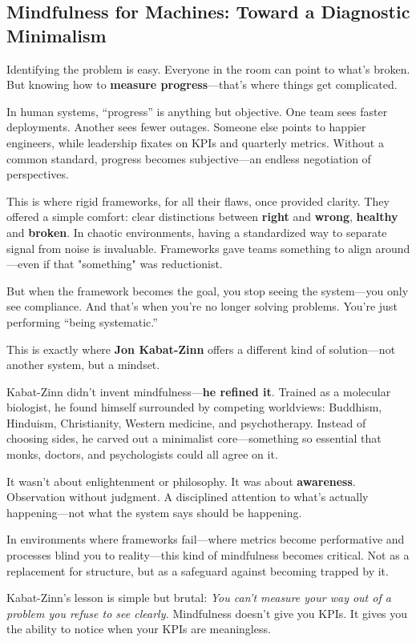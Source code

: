 \subsection{Mindfulness for Machines: Toward a Diagnostic Minimalism}

Identifying the problem is easy. Everyone in the room can point to what's broken.  
But knowing how to \textbf{measure progress}—that’s where things get complicated.

In human systems, “progress” is anything but objective. One team sees faster deployments. Another sees fewer outages. Someone else points to happier engineers, while leadership fixates on KPIs and quarterly metrics. Without a common standard, progress becomes subjective—an endless negotiation of perspectives.

This is where rigid frameworks, for all their flaws, once provided clarity. They offered a simple comfort: clear distinctions between \textbf{right} and \textbf{wrong}, \textbf{healthy} and \textbf{broken}. In chaotic environments, having a standardized way to separate signal from noise is invaluable. Frameworks gave teams something to align around—even if that "something" was reductionist.

But when the framework becomes the goal, you stop seeing the system—you only see compliance.  
And that’s when you're no longer solving problems. You're just performing “being systematic.”

This is exactly where \textbf{Jon Kabat-Zinn} offers a different kind of solution—not another system, but a mindset.

Kabat-Zinn didn’t invent mindfulness—\textbf{he refined it}. Trained as a molecular biologist, he found himself surrounded by competing worldviews: Buddhism, Hinduism, Christianity, Western medicine, and psychotherapy. Instead of choosing sides, he carved out a minimalist core—something so essential that monks, doctors, and psychologists could all agree on it.

It wasn’t about enlightenment or philosophy. It was about \textbf{awareness}.  Observation without judgment. A disciplined attention to what’s actually happening—not what the system says should be happening.

In environments where frameworks fail—where metrics become performative and processes blind you to reality—this kind of mindfulness becomes critical. Not as a replacement for structure, but as a safeguard against becoming trapped by it.

Kabat-Zinn’s lesson is simple but brutal: \textit{You can’t measure your way out of a problem you refuse to see clearly.}  Mindfulness doesn’t give you KPIs. It gives you the ability to notice when your KPIs are meaningless.

